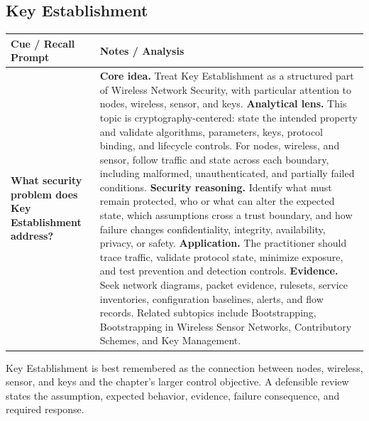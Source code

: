 \documentclass[11pt]{article}
\newcommand{\CornellHeader}{%
\rowcolor{Navy}\color{white}\bfseries Cue / Recall Prompt & \color{white}\bfseries Notes / Analysis\\\hline}
\newcommand{\CornellRow}[2]{%
\cellcolor{CueGray}\RaggedRight\textbf{#1} & \RaggedRight #2\\\hline}
\begin{document}
\subsection*{Key Establishment}
\begin{longtable}{>{\RaggedRight\arraybackslash}p{}|>{\RaggedRight\arraybackslash}p{}}
\CornellHeader
\CornellRow{What security problem does Key Establishment address?}{\textbf{Core idea.} Treat Key Establishment as a structured part of Wireless Network Security, with particular attention to nodes, wireless, sensor, and keys. \textbf{Analytical lens.} This topic is cryptography-centered: state the intended property and validate algorithms, parameters, keys, protocol binding, and lifecycle controls. For nodes, wireless, and sensor, follow traffic and state across each boundary, including malformed, unauthenticated, and partially failed conditions. \textbf{Security reasoning.} Identify what must remain protected, who or what can alter the expected state, which assumptions cross a trust boundary, and how failure changes confidentiality, integrity, availability, privacy, or safety. \textbf{Application.} The practitioner should trace traffic, validate protocol state, minimize exposure, and test prevention and detection controls. \textbf{Evidence.} Seek network diagrams, packet evidence, rulesets, service inventories, configuration baselines, alerts, and flow records. Related subtopics include Bootstrapping, Bootstrapping in Wireless Sensor Networks, Contributory Schemes, and Key Management.}
\end{longtable}
\begin{topicsummary}
Key Establishment is best remembered as the connection between nodes, wireless, sensor, and keys and the chapter's larger control objective. A defensible review states the assumption, expected behavior, evidence, failure consequence, and required response.
\end{topicsummary}
\end{document}
